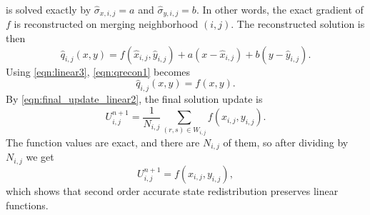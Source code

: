 is solved exactly by $\widehat{\sigma}_{x,i,j}=a$ and
$\widehat{\sigma}_{y,i,j}=b$.  In other words, the exact gradient 
of $f$ is reconstructed on merging neighborhood $(i,j)$.  
The reconstructed solution is then
\begin{equation}
    \label{eqn:qrecon1}
    \hat{q}_{i,j}(x,y) = f(\widehat{x}_{i,j},\widehat{y}_{i,j}) + a(x-\widehat{x}_{i,j})+b(y-\widehat{y}_{i,j}) .
\end{equation}
Using \eqref{eqn:linear3}, \eqref{eqn:qrecon1} becomes
\begin{equation}
    \label{eqn:qrecon2}
    \hat{q}_{i,j}(x,y) = f(x,y).
\end{equation}
By \eqref{eqn:final_update_linear2}, the final solution update is
\begin{equation} 
U^{n+1}_{i,j} = \frac{1}{N_{i,j}}\sum_{(r,s) \in W_{i,j}}f(x_{i,j},y_{i,j}).
\end{equation}
The function values are exact, and there are $N_{i,j}$ of them, so
after dividing by $N_{i,j}$ we get
\begin{equation} 
U^{n+1}_{i,j} = f(x_{i,j},y_{i,j}),
\end{equation}
which shows that second order accurate state redistribution preserves linear functions.



